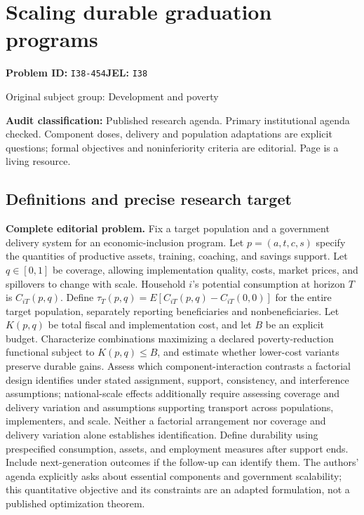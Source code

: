 \documentclass[11pt,a4paper]{article}
\begin{document}
\section*{Scaling durable graduation programs}
\textbf{Problem ID:} \texttt{I38-454}\quad \textbf{JEL:} \texttt{I38}\par
\label{problem:OP-0371}
{\sffamily\small\color{muted}Original subject group: Development and poverty\par}
\label{definitions:problem:30007653}
\textbf{Audit classification:} Published research agenda. Primary institutional agenda checked. Component doses, delivery and population adaptations are explicit questions; formal objectives and noninferiority criteria are editorial. Page is a living resource.
\subsection*{Definitions and precise research target}
\textbf{Complete editorial problem.} Fix a target population and a government delivery system for an economic-inclusion program. Let \(p=(a,t,c,s)\) specify the quantities of productive assets, training, coaching, and savings support. Let \(q\in[0,1]\) be coverage, allowing implementation quality, costs, market prices, and spillovers to change with scale. Household \(i\)'s potential consumption at horizon \(T\) is \(C_{iT}(p,q)\). Define \(\tau_T(p,q)=E[C_{iT}(p,q)-C_{iT}(0,0)]\) for the entire target population, separately reporting beneficiaries and nonbeneficiaries. Let \(K(p,q)\) be total fiscal and implementation cost, and let \(B\) be an explicit budget. Characterize combinations maximizing a declared poverty-reduction functional subject to \(K(p,q)\le B\), and estimate whether lower-cost variants preserve durable gains. Assess which component-interaction contrasts a factorial design identifies under stated assignment, support, consistency, and interference assumptions; national-scale effects additionally require assessing coverage and delivery variation and assumptions supporting transport across populations, implementers, and scale. Neither a factorial arrangement nor coverage and delivery variation alone establishes identification. Define durability using prespecified consumption, assets, and employment measures after support ends. Include next-generation outcomes if the follow-up can identify them. The authors' agenda explicitly asks about essential components and government scalability; this quantitative objective and its constraints are an adapted formulation, not a published optimization theorem.
\end{document}
